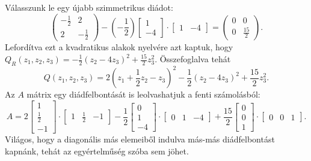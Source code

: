\documentclass[a4paper, showtrims]{memoir}
\theoremstyle{plain}
\theoremstyle{remark}
\theoremstyle{definition}
\begin{document}
    Válasszunk le egy újabb szimmetrikus diádot:
    \[
        \begin{pmatrix}
            -\frac{1}{2}&2\\
            2&-\frac{1}{2}
        \end{pmatrix}
        -\left( -\frac{1}{2} \right)
        \begin{bmatrix}
            1\\-4
        \end{bmatrix}
        \cdot
        \begin{bmatrix}
            1&-4
        \end{bmatrix}
        =
        \begin{pmatrix}
            0&0\\
            0&\frac{15}{2}
        \end{pmatrix}.
    \]
    Lefordítva ezt a kvadratikus alakok nyelvére azt kaptuk,
    hogy
    \(
        Q_R\left( z_1,z_2,z_3 \right)
        =
        -\frac{1}{2}\left( z_2-4z_3 \right)^2+\frac{15}{2}z_3^2.
    \)
    Összefoglalva tehát
    \[
        Q\left( z_1,z_2,z_3 \right)
        =
        2\left( z_1+\frac{1}{2}z_2-z_3 \right)^2
        -\frac{1}{2}\left( z_2-4z_3 \right)^2
        +\frac{15}{2}z_3^2.
    \]
    Az $A$ mátrix egy diádfelbontását is leolvashatjuk a fenti számolásból:
    \[
        A
        =
        2
        \begin{bmatrix}
        1\\ \frac{1}{2}\\ -1
        \end{bmatrix}
        \cdot
        \begin{bmatrix}
        1& \frac{1}{2}& -1
        \end{bmatrix}
        -\frac{1}{2}
        \begin{bmatrix}
            0\\1\\-4
        \end{bmatrix}
        \cdot
        \begin{bmatrix}
            0&1&-4
        \end{bmatrix}
        +
        \frac{15}{2}
        \begin{bmatrix}
            0\\0\\1
        \end{bmatrix}
        \cdot
        \begin{bmatrix}
            0&0&1
        \end{bmatrix}.
    \]
    Világos, hogy a diagonális más elemeiből indulva más-más diádfelbontást kapnánk, 
    tehát az egyértelműség szóba sem jöhet.
\end{document}
